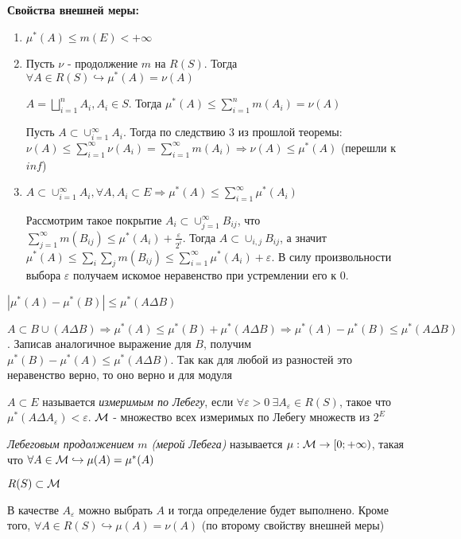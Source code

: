 \par \textbf{Свойства внешней меры:} \begin{enumerate}
    \item $\mu^*(A) \leq m(E) < +\infty$
    \item Пусть $\nu$ - продолжение $m$ на $R(S)$. Тогда $\forall A \in R(S) \hookrightarrow \mu^*(A)=\nu(A)$
    \par \Proof $A=\bigsqcup_{i=1}^n A_i, A_i \in S$. Тогда $\mu^*(A) \leq \sum_{i=1}^n m(A_i)=\nu(A)$
    \par Пусть $A \subset \cup_{i=1}^\infty A_i$. Тогда по следствию 3 из прошлой теоремы: $\nu(A) \leq \sum_{i=1}^\infty \nu(A_i)=\sum_{i=1}^\infty m(A_i) \Rightarrow \nu(A) \leq \mu^*(A)$ (перешли к $inf$) \EndProof
    \item $A \subset \cup_{i=1}^\infty A_i, \forall A, A_i \subset E \Rightarrow \mu^*(A) \leq \sum_{i=1}^\infty \mu^*(A_i)$
    \par \Proof Рассмотрим такое покрытие $A_i \subset \cup_{j=1}^\infty B_{ij}$, что $\sum_{j=1}^\infty m(B_{ij}) \leq \mu^*(A_i)+\frac{\varepsilon}{2^i}$. Тогда $A \subset \cup_{i, j} B_{ij}$, а значит $\mu^*(A) \leq \sum_i \sum_j m(B_{ij}) \leq \sum_{i=1}^\infty \mu^*(A_i) + \varepsilon$. В силу произвольности выбора $\varepsilon$ получаем искомое неравенство при устремлении его к 0. \EndProof
\end{enumerate}

\par \Conseq $|\mu^*(A)-\mu^*(B)| \leq \mu^*(A \Delta B)$
\par \Proof $A \subset B \cup (A \Delta B) \Rightarrow \mu^*(A) \leq \mu^*(B)+\mu^*(A \Delta B) \Rightarrow \mu^*(A)-\mu^*(B) \leq \mu^*(A \Delta B)$. Записав аналогичное выражение для $B$, получим $\mu^*(B)-\mu^*(A) \leq \mu^*(A \Delta B)$. Так как для любой из разностей это неравенство верно, то оно верно и для модуля \EndProof

\Def $A \subset E$ называется \textit{измеримым по Лебегу}, если $\forall \varepsilon > 0 \: \exists A_\varepsilon \in R(S)$, такое что $\mu^*(A \Delta A_\varepsilon)<\varepsilon$. $\mathcal{M}$ - множество всех измеримых по Лебегу множеств из $2^E$

\par \Def \textit{Лебеговым продолжением $m$ (мерой Лебега)} называется $\mu: \mathcal{M} \rightarrow [0;+\infty)$, такая что $\forall A \in \mathcal{M} \hookrightarrow \mu(A)=\mu^*(A)$

\par \Statement $R(S) \subset \mathcal{M}$
\par \Proof В качестве $A_\varepsilon$ можно выбрать $A$ и тогда определение будет выполнено. Кроме того, $\forall A \in R(S) \hookrightarrow \mu(A)=\nu(A)$ (по второму свойству внешней меры) \EndProof

